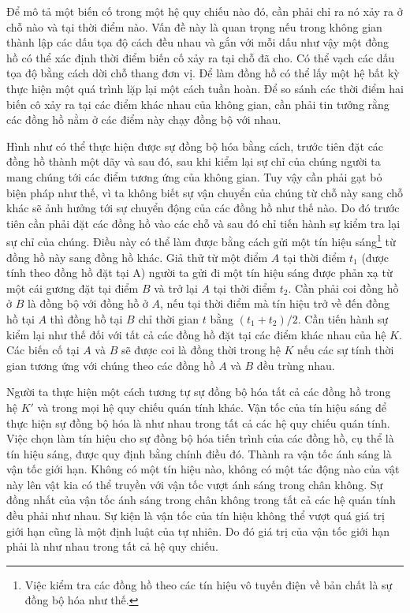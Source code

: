 Để mô tả một biến cố trong một hệ quy chiếu nào đó, cần phải chỉ ra nó xảy ra ở chỗ nào và tại thời điểm nào. Vấn đề này là quan trọng nếu trong không gian thành lập các dấu tọa độ cách đều nhau và gắn với mỗi dấu như vậy một đồng hồ có thể xác định thời điểm biến cố xảy ra tại chỗ đã cho. Có thể vạch các dấu tọa độ bằng cách dời chỗ thang đơn vị. Để làm đồng hồ có thể lấy một hệ bất kỳ thực hiện một quá trình lặp lại một cách tuần hoàn. Để so sánh các thời điểm hai biến cô xảy ra tại các điểm khác nhau của không gian, cần phải tin tưởng rằng các đồng hồ nằm ở các điểm này chạy đồng bộ với nhau.

Hình như có thể thực hiện được sự đồng bộ hóa bằng cách, trước tiên đặt các đồng hồ thành một dãy và sau đó, sau khi kiểm lại sự chỉ của chúng người ta mang chúng tới các điểm tương ứng của không gian. Tuy vậy cần phải gạt bỏ biện pháp như thế, vì ta không biết sự vận chuyển của chúng từ chỗ này sang chỗ khác sẽ ảnh hưởng tới sự chuyển động của các đồng hồ như thế nào. Do đó trước tiên cần phải đặt các đồng hồ vào các chỗ và sau đó chỉ tiến hành sự kiểm tra lại sự chỉ của chúng. Điều này có thể làm được bằng cách gửi một tín hiệu sáng\footnote{Việc kiểm tra các đồng hồ theo các tín hiệu vô tuyến điện về bản chất là sự đồng bộ hóa như thế.} từ đồng hồ này sang đồng hồ khác. Giả thử từ một điểm $A$ tại thời điểm $t_1$ (được tính theo đồng hồ đặt tại A) người ta gửi đi một tín hiệu sáng được phản xạ từ một cái gương đặt tại điểm $B$ và trở lại $A$ tại thời điểm $t_2$. Cần phải coi đồng hồ ở $B$ là đồng bộ với đồng hồ ở $A$, nếu tại thời điểm mà tín hiệu trở về đến đồng hồ tại $A$ thì đồng hồ tại $B$ chỉ thời gian $t$ bằng $(t_1+t_2)/2$. Cần tiến hành sự kiểm lại như thế đối với tất cả các đồng hồ đặt tại các điểm khác nhau của hệ $K$. Các biến cố tại $A$ và $B$ sẽ được coi là đồng thời trong hệ $K$ nếu các sự tính thời gian tương ứng với chúng theo các đồng hồ $A$ và $B$ đều trùng nhau.

Người ta thực hiện một cách tương tự sự đồng bộ hóa tất cả các đồng hồ trong hệ $K'$ và trong mọi hệ quy chiếu quán tính khác. Vận tốc của tín hiệu sáng để thực hiện sự đồng bộ hóa là như nhau trong tất cả các hệ quy chiếu quán tính. Việc chọn làm tín hiệu cho sự đồng bộ hóa tiến trình của các đồng hồ, cụ thể là tín hiệu sáng, được quy định bằng chính điều đó. Thành ra vận tốc ánh sáng là vận tốc giới hạn. Không có một tín hiệu nào, không có một tác động nào của vật này lên vật kia có thể truyền với vận tốc vượt ánh sáng trong chân không. Sự đồng nhất của vận tốc ánh sáng trong chân không trong tất cả các hệ quán tính đều phải như nhau. Sự kiện là vận tốc của tín hiệu không thể vượt quá giá trị giới hạn cũng là một định luật của tự nhiên. Do đó giá trị của vận tốc giới hạn phải là như nhau trong tất cả hệ quy chiếu.


